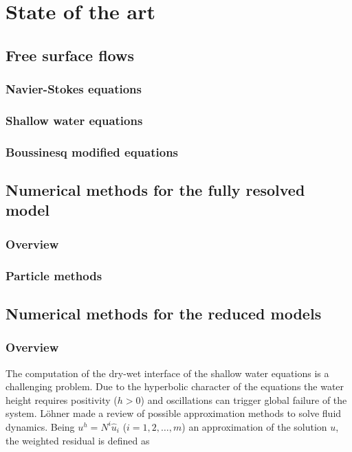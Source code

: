 
\chapter{State of the art}
\label{equations}


\section{Free surface flows}

\subsection{Navier-Stokes equations}


\subsection{Shallow water equations}


\subsection{Boussinesq modified equations}




\section{Numerical methods for the fully resolved model}

\subsection{Overview}

\subsection{Particle methods}



\section{Numerical methods for the reduced models}


\subsection{Overview}

The computation of the dry-wet interface of the shallow water equations is a challenging problem. Due to the hyperbolic character of the equations the water height requires positivity ($h>0$) and oscillations can trigger global failure of the system. Löhner \cite{lohner2008} made a review of possible approximation methods to solve fluid dynamics. Being $u^h = N^i\hat{u}_i$ ($i=1,2,\dots,m$) an approximation of the solution $u$, the weighted residual is defined as

